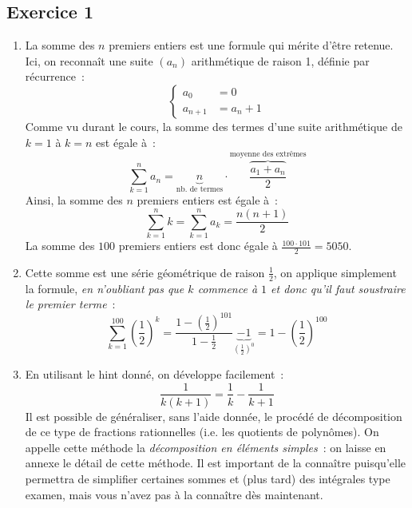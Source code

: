 \documentclass{article}
\begin{document}
\subsection{Exercice 1}
\begin{enumerate}
    \item La somme des $n$ premiers entiers est une formule qui mérite d'être retenue. Ici, on reconnaît une suite $(a_n)$ arithmétique de raison 1, définie par récurrence~:
    \[
    \begin{cases}
    a_0 & = 0 \\
    a_{n+1} & = a_{n} + 1
    \end{cases}
    \]
    Comme vu durant le cours, la somme des termes d'une suite arithmétique de $k = 1$ à $k = n$ est égale à~:
    \[
    \sum_{k = 1}^{n} a_n = \underbrace{n}_{\textrm{nb. de termes}}\cdot \overbrace{\frac{a_1 + a_n}{2}}^{\textrm{moyenne des extrêmes}}
    \]
    Ainsi, la somme des $n$ premiers entiers est égale à~:
    \[
    \boxed{
    \sum_{k = 1}^{n} k = \sum_{k = 1}^{n} a_k = \frac{n(n+1)}{2}
    }
    \]
    La somme des $100$ premiers entiers est donc égale à $\frac{100\cdot 101}{2} = 5050$.
    
    \item Cette somme est une série géométrique de raison $\frac{1}{2}$, on applique simplement la formule, \emph{en n'oubliant pas que $k$ commence à $1$ et donc qu'il faut soustraire le premier terme}~:
    \[
    \boxed{
    \sum_{k = 1}^{100} \left ( \frac{1}{2} \right )^k = \frac{1- \left (\frac{1}{2} \right )^{101}}{1-\frac{1}{2}} \underbrace{- 1}_{\left ( \frac{1}{2}\right )^0} = 1 - \left ( \frac{1}{2} \right )^{100}
    }
    \]
    
    \item En utilisant le hint donné, on développe facilement~:
    \[
    \frac{1}{k(k+1)} = \frac{1}{k} - \frac{1}{k+1}
    \]
    Il est possible de généraliser, sans l'aide donnée, le procédé de décomposition de ce type de fractions rationnelles (i.e. les quotients de polynômes). On appelle cette méthode la \emph{décomposition en éléments simples}~: on laisse en annexe le détail de cette méthode. Il est important de la connaître puisqu'elle permettra de simplifier certaines sommes et (plus tard) des intégrales type examen, mais vous n'avez pas à la connaître dès maintenant.
    

\end{enumerate}
\end{document}
